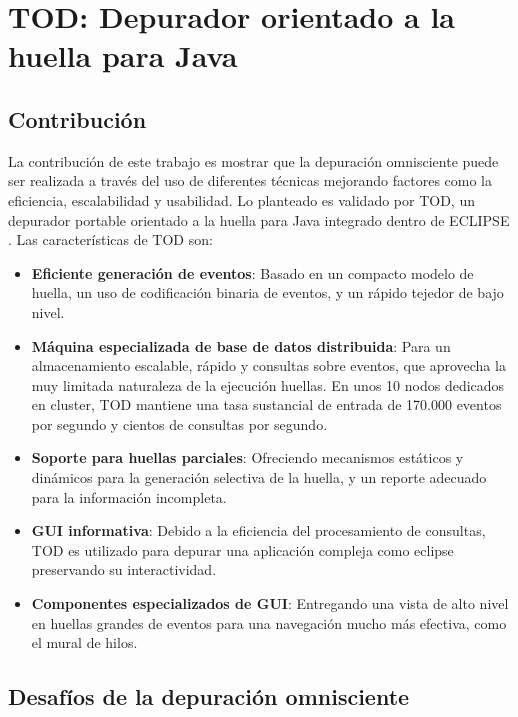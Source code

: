 \documentclass[12pt,legalpaper]{report}
\begin{document}
	\section{TOD: Depurador orientado a la huella para Java}
		\subsection{Contribución}

La contribución de este trabajo es mostrar que la depuración omnisciente puede ser realizada a través del uso de diferentes técnicas mejorando factores como la eficiencia, escalabilidad y usabilidad.  Lo planteado es validado por TOD, un depurador portable orientado a la huella para Java integrado dentro de ECLIPSE \cite{eclipse}.  Las características de TOD son:
\begin{itemize}
	\item \textbf{Eficiente generación de eventos}: Basado en un compacto modelo de huella, un uso de codificación binaria de eventos, y un rápido tejedor de bajo nivel.

	\item \textbf{Máquina especializada de base de datos distribuida}: Para un almacenamiento escalable, rápido y consultas sobre eventos, que aprovecha la muy limitada naturaleza de la ejecución huellas.  En unos 10 nodos dedicados en cluster, TOD mantiene una tasa sustancial de entrada de 170.000 eventos por segundo y cientos de consultas por segundo.

	\item \textbf{Soporte para huellas parciales}: Ofreciendo mecanismos estáticos y dinámicos para la generación selectiva de la huella, y un reporte adecuado para la información incompleta.

	\item \textbf{GUI informativa}: Debido a la eficiencia del procesamiento de consultas, TOD es utilizado para depurar una aplicación compleja como eclipse preservando su interactividad.

	\item \textbf{Componentes especializados de GUI}: Entregando una vista de alto nivel en huellas grandes de eventos para una navegación mucho más efectiva, como el mural de hilos.
\end{itemize}


		\subsection[Desafíos]{Desafíos de la depuración omnisciente}
\end{document}
